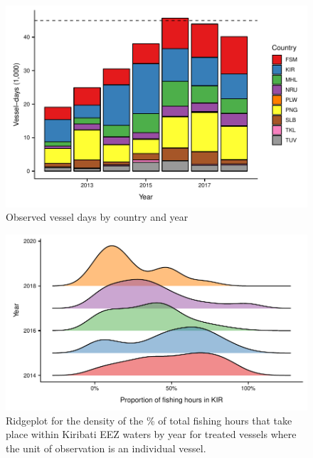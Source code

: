 \documentclass[9p,twocolumn,twoside,lineno]{pnas-new}
\begin{document}
\begin{figure}
\centering
	\includegraphics{img/all_PS_VDS_cty_year.pdf}
	\caption{\label{fig:all_PS_VDS_cty_year}Observed vessel days by country and year}
\end{figure}

\clearpage

\begin{figure}
\centering
	\includegraphics{img/hist_kir_fishing.pdf}
	\caption{\label{fig:hist_kir_fishing}Ridgeplot for the density of the \% of total fishing hours that take place within Kiribati EEZ waters by year for treated vessels where the unit of observation is an individual vessel.}
	

	
\end{figure}
\end{document}
